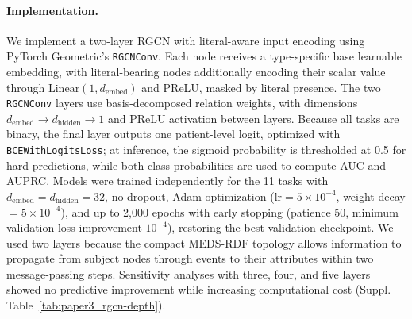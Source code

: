 \paragraph{Implementation.} We implement a two-layer RGCN with literal-aware input encoding using PyTorch Geometric's \texttt{RGCNConv}. Each node receives a type-specific base learnable embedding, with literal-bearing nodes additionally encoding their scalar value through $\mathrm{Linear}(1,d_{\text{embed}})$ and PReLU, masked by literal presence. The two \texttt{RGCNConv} layers use basis-decomposed relation weights, with dimensions $d_{\text{embed}}\rightarrow d_{\text{hidden}}\rightarrow1$ and PReLU activation between layers. Because all tasks are binary, the final layer outputs one patient-level logit, optimized with \texttt{BCEWithLogitsLoss}; at inference, the sigmoid probability is thresholded at 0.5 for hard predictions, while both class probabilities are used to compute AUC and AUPRC. Models were trained independently for the 11 tasks with $d_{\text{embed}}=d_{\text{hidden}}=32$, no dropout, Adam optimization ($\mathrm{lr}=5\times10^{-4}$, weight decay $=5\times10^{-4}$), and up to 2,000 epochs with early stopping (patience 50, minimum validation-loss improvement $10^{-4}$), restoring the best validation checkpoint. We used two layers because the compact MEDS-RDF topology allows information to propagate from subject nodes through events to their attributes within two message-passing steps. Sensitivity analyses with three, four, and five layers showed no predictive improvement while increasing computational cost (Suppl. Table~\ref{tab:paper3_rgcn-depth}).

